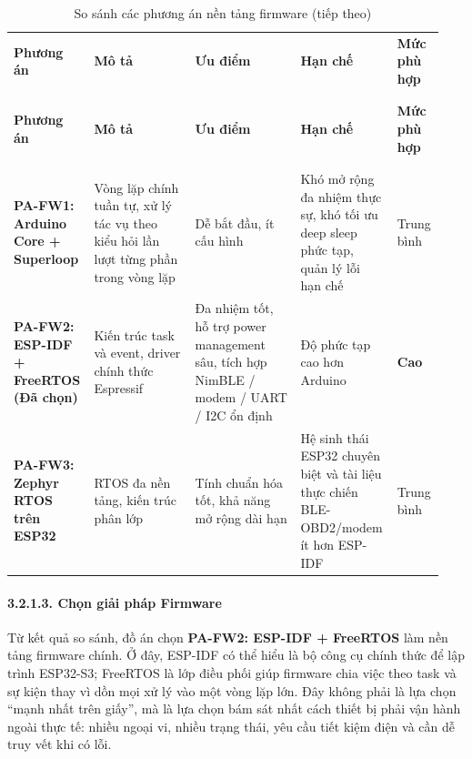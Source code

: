 \documentclass[a4paper]{extarticle}
\newcommand{\thesissettableid}[2]{%
  \renewcommand{\thetable}{#1}%
  \renewcommand{\theHtable}{#2}%
}
\begin{document}
{\thesissettableid{3.5A}{tab-ch3-so-sanh-cac-phuong-an-nen-tang-firmware}
\def\LTcaptype{table}
\begin{longtable}{|L{0.138\linewidth}|L{0.236\linewidth}|L{0.246\linewidth}|L{0.224\linewidth}|L{0.100\linewidth}|}
\caption{So sánh các phương án nền tảng firmware}\label{tab:ch3-so-sanh-cac-phuong-an-nen-tang-firmware}\\
\hline \textbf{Phương án} & \textbf{Mô tả} & \textbf{Ưu điểm} & \textbf{Hạn chế} & \textbf{Mức phù hợp} \\
\\\hline
\endfirsthead
\caption[]{So sánh các phương án nền tảng firmware (tiếp theo)}\\
\hline \textbf{Phương án} & \textbf{Mô tả} & \textbf{Ưu điểm} & \textbf{Hạn chế} & \textbf{Mức phù hợp} \\
\\\hline
\endhead
\\\hline
\endfoot
\endlastfoot
\textbf{PA-FW1: Arduino Core + Superloop} & Vòng lặp chính tuần tự, xử
lý tác vụ theo kiểu hỏi lần lượt từng phần trong vòng lặp & Dễ bắt đầu, ít cấu hình & Khó mở rộng đa nhiệm
thực sự, khó tối ưu deep sleep phức tạp, quản lý lỗi hạn chế & Trung
bình \\\hline
\textbf{PA-FW2: ESP-IDF + FreeRTOS (Đã chọn)} & Kiến trúc task và event,
driver chính thức Espressif & Đa nhiệm tốt, hỗ trợ power management sâu,
tích hợp NimBLE / modem / UART / I2C ổn định & Độ phức tạp cao hơn Arduino &
\textbf{Cao} \\\hline
\textbf{PA-FW3: Zephyr RTOS trên ESP32} & RTOS đa nền tảng, kiến trúc
phân lớp & Tính chuẩn hóa tốt, khả năng mở rộng dài hạn & Hệ sinh thái
ESP32 chuyên biệt và tài liệu thực chiến BLE-OBD2/modem ít hơn ESP-IDF &
Trung bình \\\hline
\end{longtable}
}


\paragraph{3.2.1.3. Chọn giải pháp
Firmware}\label{3123-chux1ecdn-giux1ea3i-phuxe1p-firmware}

Từ kết quả so sánh, đồ án chọn \textbf{PA-FW2: ESP-IDF + FreeRTOS} làm
nền tảng firmware chính. Ở đây, ESP-IDF có thể hiểu là bộ công cụ chính
thức để lập trình ESP32-S3; FreeRTOS là lớp điều phối giúp firmware chia
việc theo task và sự kiện thay vì dồn mọi xử lý vào một vòng lặp lớn.
Đây không phải là lựa chọn ``mạnh nhất trên giấy'', mà là lựa chọn bám
sát nhất cách thiết bị phải vận hành ngoài thực tế: nhiều ngoại vi,
nhiều trạng thái, yêu cầu tiết kiệm điện và cần dễ truy vết khi có lỗi.
\end{document}
